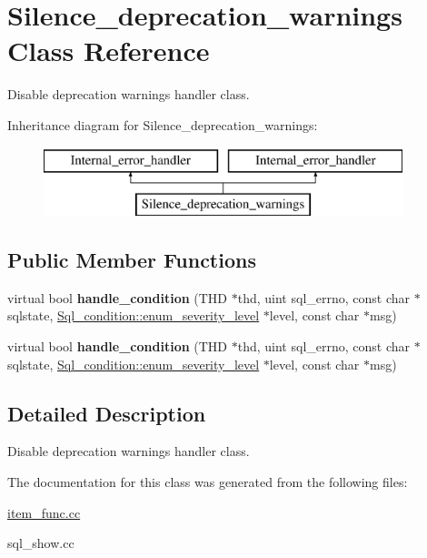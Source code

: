 \hypertarget{classSilence__deprecation__warnings}{}\section{Silence\+\_\+deprecation\+\_\+warnings Class Reference}
\label{classSilence__deprecation__warnings}


Disable deprecation warnings handler class.  


Inheritance diagram for Silence\+\_\+deprecation\+\_\+warnings\+:\begin{figure}[H]
\begin{center}
\leavevmode
\includegraphics[height=2.000000cm]{classSilence__deprecation__warnings}
\end{center}
\end{figure}
\subsection*{Public Member Functions}
\begin{DoxyCompactItemize}
\item 
\mbox{\label{classSilence__deprecation__warnings_a0d7a80b966e16e2f8506a676616aa9ef}} 
virtual bool {\bfseries handle\+\_\+condition} (T\+HD $\ast$thd, uint sql\+\_\+errno, const char $\ast$sqlstate, \mbox{\hyperlink{classSql__condition_ab0602581e19cddb609bfe10c44be4e83}{Sql\+\_\+condition\+::enum\+\_\+severity\+\_\+level}} $\ast$level, const char $\ast$msg)
\item 
\mbox{\label{classSilence__deprecation__warnings_a0d7a80b966e16e2f8506a676616aa9ef}} 
virtual bool {\bfseries handle\+\_\+condition} (T\+HD $\ast$thd, uint sql\+\_\+errno, const char $\ast$sqlstate, \mbox{\hyperlink{classSql__condition_ab0602581e19cddb609bfe10c44be4e83}{Sql\+\_\+condition\+::enum\+\_\+severity\+\_\+level}} $\ast$level, const char $\ast$msg)
\end{DoxyCompactItemize}


\subsection{Detailed Description}
Disable deprecation warnings handler class. 

The documentation for this class was generated from the following files\+:\begin{DoxyCompactItemize}
\item 
\mbox{\hyperlink{item__func_8cc}{item\+\_\+func.\+cc}}\item 
sql\+\_\+show.\+cc\end{DoxyCompactItemize}
